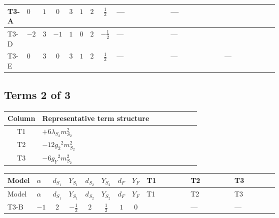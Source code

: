\documentclass[8pt]{article}
\begin{document}
\begin{landscape}
\begin{longtable}{@{}llcccccc >{\raggedright\arraybackslash}p{0.21\linewidth} >{\raggedright\arraybackslash}p{0.21\linewidth} >{\raggedright\arraybackslash}p{0.21\linewidth}@{}}
\midrule
T3-A & $0$ & $1$ & $0$ & $3$ & $1$ & $2$ & $\frac{1}{2}$ & --- & --- & \scriptsize\adjustbox{max width=\linewidth}{$\begin{gathered} +2 {\lambda_{12}} {m_{S_1}^2}\end{gathered}$} \\
\midrule
T3-D & $-2$ & $3$ & $-1$ & $1$ & $0$ & $2$ & $-\frac{1}{2}$ & --- & --- & \scriptsize\adjustbox{max width=\linewidth}{$\begin{gathered} 6 {\lambda_{12}} {m_{S_1}^2}\end{gathered}$} \\
\midrule
T3-E & $0$ & $3$ & $0$ & $3$ & $1$ & $2$ & $\frac{1}{2}$ & --- & --- & --- \\
\midrule
\bottomrule
\end{longtable}
\clearpage
\subsection*{Terms 2 of 3}
\begin{center}
\begin{tabular}{@{}c >{\raggedright\arraybackslash}p{0.82\linewidth}@{}}
\toprule
Column & Representative term structure \\
\midrule
T1 & \(\displaystyle +6 {\lambda_{S_2}} {m_{S_2}^2}\) \\
\midrule
T2 & \(\displaystyle -12 {g_2}^2 {m_{S_2}^2}\) \\
\midrule
T3 & \(\displaystyle -6 {g_Y}^2 {m_{S_2}^2}\) \\
\midrule
\bottomrule
\end{tabular}
\end{center}
\smallskip
\tiny
\begin{longtable}{@{}llcccccc >{\raggedright\arraybackslash}p{0.21\linewidth} >{\raggedright\arraybackslash}p{0.21\linewidth} >{\raggedright\arraybackslash}p{0.21\linewidth}@{}}
\toprule
Model & $\alpha$ & $d_{S_1}$ & $Y_{S_1}$ & $d_{S_2}$ & $Y_{S_2}$ & $d_F$ & $Y_F$ & T1 & T2 & T3 \\
\midrule
\endfirsthead
\toprule
Model & $\alpha$ & $d_{S_1}$ & $Y_{S_1}$ & $d_{S_2}$ & $Y_{S_2}$ & $d_F$ & $Y_F$ & T1 & T2 & T3 \\
\midrule
\endhead
T3-B & $-1$ & $2$ & $-\frac{1}{2}$ & $2$ & $\frac{1}{2}$ & $1$ & $0$ & \scriptsize\adjustbox{max width=\linewidth}{$\begin{gathered} +6 {\lambda_{S_2}} {m_{S_2}^2}\end{gathered}$} & --- & --- \\

\end{longtable}
\end{landscape}
\end{document}
